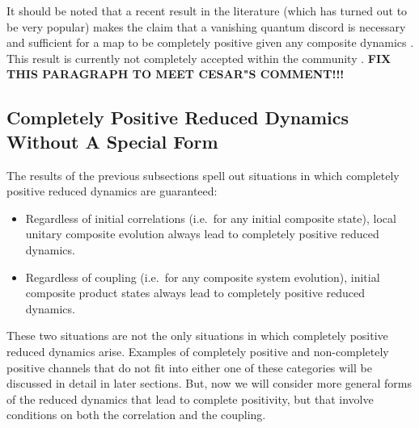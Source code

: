 It should be noted that a recent result in the literature (which has turned out to be very popular) makes the claim that a vanishing quantum discord is necessary and sufficient for a map to be completely positive given any composite dynamics \cite{Lidar2009a}.  This result is currently not completely accepted within the community \cite{Cesar2013,Simon2013}. {\bf FIX THIS PARAGRAPH TO MEET CESAR"S COMMENT!!!}

\subsection{Completely Positive Reduced Dynamics Without A Special Form}
The results of the previous subsections spell out situations in which completely positive reduced dynamics are guaranteed:
\begin{itemize}
\item Regardless of initial correlations (i.e.\ for any initial composite state), local unitary composite evolution always lead to completely positive reduced dynamics.
\item Regardless of coupling (i.e.\ for any composite system evolution), initial composite product states always lead to completely positive reduced dynamics.
\end{itemize}
These two situations are not the only situations in which completely positive reduced dynamics arise.  Examples of completely positive and non-completely positive channels that do not fit into either one of these categories will be discussed in detail in later sections.  But, now we will consider more general forms of the reduced dynamics that lead to complete positivity, but that involve conditions on both the correlation and the coupling.

